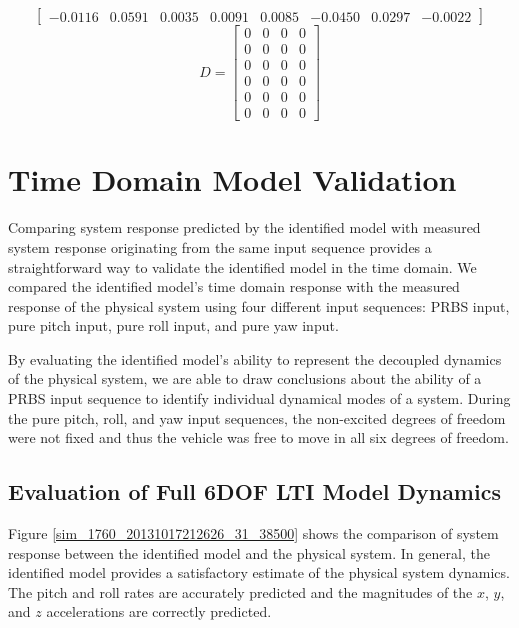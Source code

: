 \begin{table}[!htb]
{\begin{minipage}{5.5in}
\begin{equation*}
\begin{bmatrix}
-0.0116&0.0591&0.0035&0.0091&0.0085&-0.0450&0.0297&-0.0022
\end{bmatrix}
\end{equation*} 
\begin{equation*}
D = \begin{bmatrix}
0&0&0&0\\
0&0&0&0\\
0&0&0&0\\
0&0&0&0\\
0&0&0&0\\
0&0&0&0
\end{bmatrix}
\end{equation*}
\normalsize %
\end{minipage}}
\label{identified_system_matrices}
\end{table}









\newpage
\section{Time Domain Model Validation}
Comparing system response predicted by the identified model with measured system response originating from the same input sequence provides a straightforward way to validate the identified model in the time domain. We compared the identified model's time domain response with the measured response of the physical system using four different input sequences: PRBS input, pure pitch input, pure roll input, and pure yaw input. 

By evaluating the identified model's ability to represent the decoupled dynamics of the physical system, we are able to draw conclusions about the ability of a PRBS input sequence to identify individual dynamical modes of a system. During the pure pitch, roll, and yaw input sequences, the non-excited degrees of freedom were not fixed and thus the vehicle was free to move in all six degrees of freedom.

\subsection{Evaluation of Full 6DOF LTI Model Dynamics}
Figure \ref{sim_1760_20131017212626_31_38500} shows the comparison of system response between the identified model and the physical system. In general, the identified model provides a satisfactory estimate of the physical system dynamics. The pitch and roll rates are accurately predicted and the magnitudes of the $x$, $y$, and $z$ accelerations are correctly predicted. 

